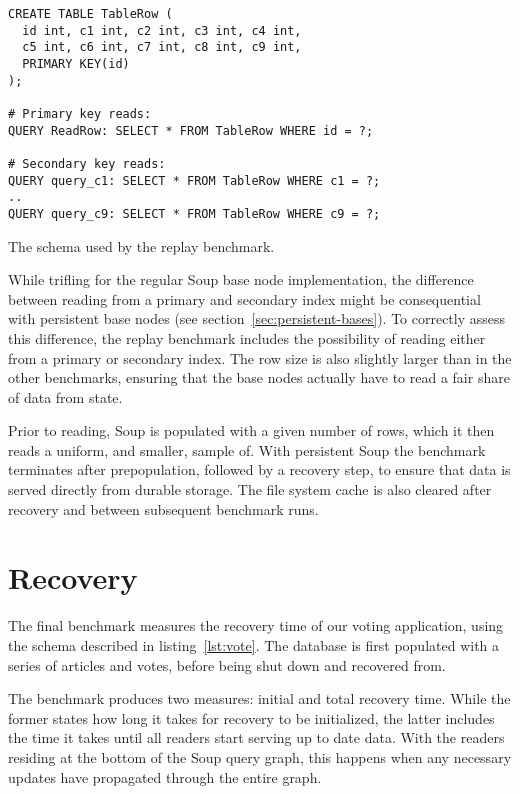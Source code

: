 \begin{listing}[H]
  \begin{verbatim}
CREATE TABLE TableRow (
  id int, c1 int, c2 int, c3 int, c4 int,
  c5 int, c6 int, c7 int, c8 int, c9 int,
  PRIMARY KEY(id)
);

# Primary key reads:
QUERY ReadRow: SELECT * FROM TableRow WHERE id = ?;

# Secondary key reads:
QUERY query_c1: SELECT * FROM TableRow WHERE c1 = ?;
..
QUERY query_c9: SELECT * FROM TableRow WHERE c9 = ?;
  \end{verbatim}

  \caption{The schema used by the replay benchmark.}\label{lst:replay}
\end{listing}

While trifling for the regular Soup base node implementation, the difference
between reading from a primary and secondary index might be consequential with
persistent base nodes (see section~\ref{sec:persistent-bases}). To correctly
assess this difference, the replay benchmark includes the possibility of reading
either from a primary or secondary index. The row size is also slightly larger
than in the other benchmarks, ensuring that the base nodes actually have to read
a fair share of data from state.

Prior to reading, Soup is populated with a given number of rows, which it then
reads a uniform, and smaller, sample of. With persistent Soup the benchmark
terminates after prepopulation, followed by a recovery step, to ensure that data
is served directly from durable storage. The file system cache is also cleared
after recovery and between subsequent benchmark runs.

\section{Recovery}

The final benchmark measures the recovery time of our voting application, using
the schema described in listing~\ref{lst:vote}. The database is first populated
with a series of articles and votes, before being shut down and recovered from.

The benchmark produces two measures: initial and total recovery time. While the
former states how long it takes for recovery to be initialized, the latter
includes the time it takes until all readers start serving up to date data. With
the readers residing at the bottom of the Soup query graph, this happens when
any necessary updates have propagated through the entire graph.

